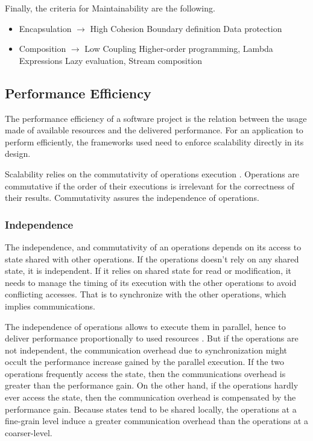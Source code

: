 Finally, the criteria for Maintainability are the following.

\begin{itemize}
\item Encapsulation $\to$ High Cohesion
  \subitem Boundary definition
  \subitem Data protection
\item Composition $\to$ Low Coupling
  \subitem Higher-order programming, Lambda Expressions
  \subitem Lazy evaluation, Stream composition
\end{itemize}


\subsection{Performance Efficiency}

The performance efficiency of a software project is the relation between the usage made of available resources and the delivered performance.
For an application to perform efficiently, the frameworks used need to enforce scalability directly in its design.

Scalability relies on the commutativity of operations execution \cite{Clements2013a}.
Operations are commutative if the order of their executions is irrelevant for the correctness of their results.
Commutativity assures the independence of operations.

\subsubsection{Independence}

The independence, and commutativity of an operations depends on its access to state shared with other operations.
If the operations doesn't rely on any shared state, it is independent.
If it relies on shared state for read or modification, it needs to manage the timing of its execution with the other operations to avoid conflicting accesses.
That is to synchronize with the other operations, which implies communications.

The independence of operations allows to execute them in parallel, hence to deliver performance proportionally to used resources \cite{Amdahl1967,Gunther1993}.
But if the operations are not independent, the communication overhead due to synchronization might occult the performance increase gained by the parallel execution.
If the two operations frequently access the state, then the communications overhead is greater than the performance gain.
On the other hand, if the operations hardly ever access the state, then the communication overhead is compensated by the performance gain.
Because states tend to be shared locally, the operations at a fine-grain level induce a greater communication overhead than the operations at a coarser-level. 

